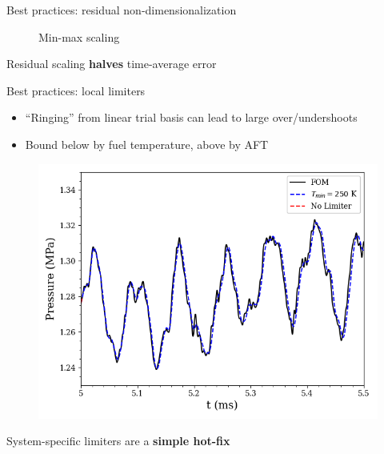 \documentclass[]{beamer}
\begin{document}
\begin{frame}{Best practices: residual non-dimensionalization}
\begin{figure}
\begin{minipage}{0.4\linewidth}
				\caption*{Min-max scaling}
			\end{minipage}
	\end{figure}
	\begin{tcolorbox}[colframe=blue!50!white,halign=center]
		Residual scaling \textbf{halves} time-average error %
	\end{tcolorbox}
\end{frame}

\begin{frame}{Best practices: local limiters}
	\begin{itemize}
		\item ``Ringing'' from linear trial basis can lead to large over/undershoots
		\item Bound below by fuel temperature, above by AFT 
	\end{itemize}
	\begin{figure}
		\centering
		\begin{minipage}{0.6\linewidth}
			\includegraphics[width=0.99\linewidth]{Images/experiments/cvrc/press_probe_limiters.png}
		\end{minipage}
	\end{figure}
	\begin{tcolorbox}[colframe=blue!50!white,halign=center]
		System-specific limiters are a \textbf{simple hot-fix}
	\end{tcolorbox}
\end{frame}
\end{document}
